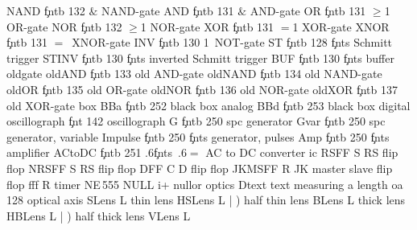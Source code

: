 \NgateIIO     NAND        \c*fntb  132 {$\&$}
 {NAND-gate}
\NgateIIO     AND         \c*fntb  131 {$\&$}
 {AND-gate}
\NgateIIO     OR          \c*fntb  131 {$\ge$1}
 {OR-gate}
\NgateIIO     NOR         \c*fntb  132 {$\ge$1}
 {NOR-gate}
\NgateIIO     XOR         \c*fntb  131 {$=$1}
 {XOR-gate}
\NgateIIO     XNOR        \c*fntb  131 {$=$\vrule width 0pt height 1.5ex\,}
 {XNOR-gate}
\NgateIO      INV         \c*fntb  130 {1\,}
 {NOT-gate}
\NgateIO      ST          \c*fntb  128 {{\c*fnts}}
 {Schmitt trigger}
\NgateIO      STINV       \c*fntb  130 {{\c*fnts}}
 {inverted Schmitt trigger}
\NgateIO      BUF         \c*fntb  130 {{\c*fnts}}
 {buffer}
\optionline oldgate
\NgateIIO     oldAND        \c*fntb  133 {}
 {old AND-gate}
\NgateIIO    oldNAND         \c*fntb  134 {}
 {old NAND-gate}
\NgateIIO     oldOR          \c*fntb  135 {}
 {old OR-gate}
\NgateIIO     oldNOR         \c*fntb  136 {}
 {old NOR-gate}
\NgateIIO     oldXOR         \c*fntb  137 {}
 {old XOR-gate}
\optionline box
\bbdef        BBa         \c*fntb  252
 {black box analog}
\bbdef        BBd         \c*fntb  253
 {black box digital}
\pagebreak
\bbdefNeT oscillograph \c*fnt  142 {}
 {oscillograph}
\bbdefNeT G    \c*fntb 250 \vbox{\*spc%
                                 }
 {generator}
\bbdefNeT Gvar \c*fntb 250 \vbox{\*spc%
                                 }
 {generator, variable}
\bbdefNeT Impulse \c*fntb 250 \c*fnts
 {generator, pulses}
\bbdefNeT Amp  \c*fntb 250 \c*fnts
 {amplifier}
\sbdef ACtoDC \c*fntb 251 \hbox{\raise.6\ht*\hbox{\c*fnts}%
                                \lower.6\dp*\hbox{\symfont$=$}}
 {AC to DC converter}
\optionline ic
\Ccirc RSFF S {RS flip flop}{}
\Ccirc NRSFF S {RS flip flop}{}
\Ccirc DFF C {D flip flop}{}
\Ccirc JKMSFF R {JK master slave flip flop}{}
\Ccirc fff R {timer NE\,555}{}
\Ccirc NULL i+ {nullor}{}
\optionline optics
\textdef Dtext {text measuring a length}
\cwdef     oa          {128\CIRCcioptic}
 {optical axis}
\cdef      SLens    L  
 {thin lens}
\cdefiv    HSLens   L   | )
 {half thin lens}
\cdef      BLens    L  
 {thick lens}
\cdefiv    HBLens   L   | )
 {half thick lens}
\cdef      VLens    L  
